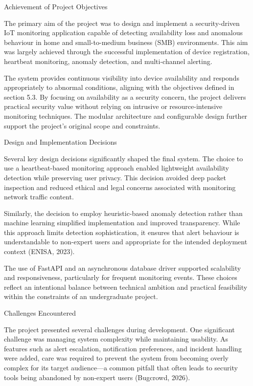 Achievement of Project Objectives

The primary aim of the project was to design and implement a security-driven IoT monitoring application capable of detecting availability loss and anomalous behaviour in home and small-to-medium business (SMB) environments. This aim was largely achieved through the successful implementation of device registration, heartbeat monitoring, anomaly detection, and multi-channel alerting.

The system provides continuous visibility into device availability and responds appropriately to abnormal conditions, aligning with the objectives defined in section 5.3. By focusing on availability as a security concern, the project delivers practical security value without relying on intrusive or resource-intensive monitoring techniques. The modular architecture and configurable design further support the project's original scope and constraints.

Design and Implementation Decisions

Several key design decisions significantly shaped the final system. The choice to use a heartbeat-based monitoring approach enabled lightweight availability detection while preserving user privacy. This decision avoided deep packet inspection and reduced ethical and legal concerns associated with monitoring network traffic content.

Similarly, the decision to employ heuristic-based anomaly detection rather than machine learning simplified implementation and improved transparency. While this approach limits detection sophistication, it ensures that alert behaviour is understandable to non-expert users and appropriate for the intended deployment context (ENISA, 2023).

The use of FastAPI and an asynchronous database driver supported scalability and responsiveness, particularly for frequent monitoring events. These choices reflect an intentional balance between technical ambition and practical feasibility within the constraints of an undergraduate project.

Challenges Encountered

The project presented several challenges during development. One significant challenge was managing system complexity while maintaining usability. As features such as alert escalation, notification preferences, and incident handling were added, care was required to prevent the system from becoming overly complex for its target audience---a common pitfall that often leads to security tools being abandoned by non-expert users (Bugcrowd, 2026).

